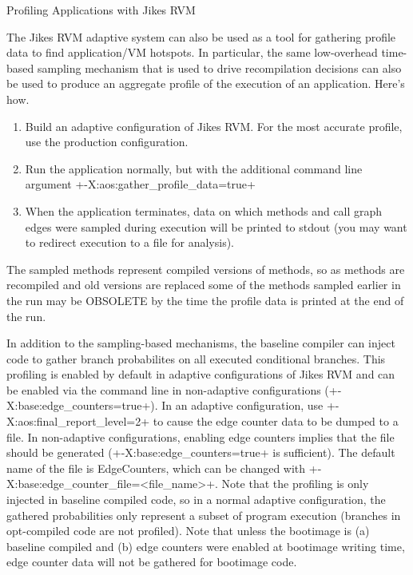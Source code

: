\begin{section}{Profiling Applications with Jikes RVM}
\label{sec:profilingapplicationswithjikesrvm}

The Jikes RVM adaptive system can also be used as a tool for gathering profile data to find application/VM hotspots. In particular, the same low-overhead time-based sampling mechanism that is used to drive recompilation decisions can also be used to produce an aggregate profile of the execution of an application. Here's how.

\begin{enumerate}
  \item Build an adaptive configuration of Jikes RVM. For the most accurate profile, use the production configuration.
  \item Run the application normally, but with the additional command line argument \spverb+-X:aos:gather_profile_data=true+
  \item When the application terminates, data on which methods and call graph edges were sampled during execution will be printed to stdout (you may want to redirect execution to a file for analysis).
\end{enumerate}

The sampled methods represent compiled versions of methods, so as methods are recompiled and old versions are replaced some of the methods sampled earlier in the run may be OBSOLETE by the time the profile data is printed at the end of the run.

In addition to the sampling-based mechanisms, the baseline compiler can inject code to gather branch probabilites on all executed conditional branches. This profiling is enabled by default in adaptive configurations of Jikes RVM and can be enabled via the command line in non-adaptive configurations (\spverb+-X:base:edge_counters=true+). In an adaptive configuration, use \newline \spverb+-X:aos:final_report_level=2+ to cause the edge counter data to be dumped to a file. In non-adaptive configurations, enabling edge counters implies that the file should be generated (\spverb+-X:base:edge_counters=true+ is sufficient). The default name of the file is EdgeCounters, which can be changed with \newline \spverb+-X:base:edge_counter_file=<file_name>+. Note that the profiling is only injected in baseline compiled code, so in a normal adaptive configuration, the gathered probabilities only represent a subset of program execution (branches in opt-compiled code are not profiled). Note that unless the bootimage is (a) baseline compiled and (b) edge counters were enabled at bootimage writing time, edge counter data will not be gathered for bootimage code.


\end{section}
